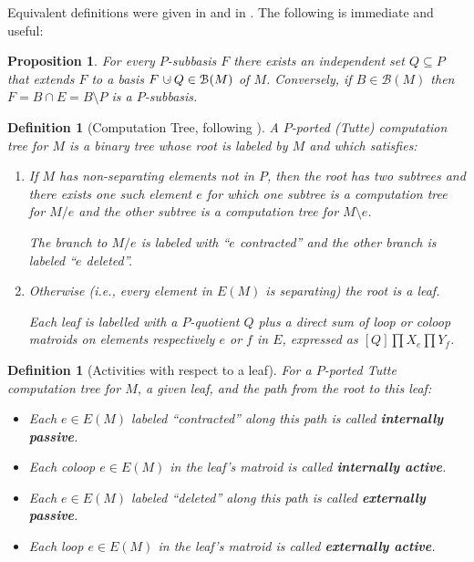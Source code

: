 \documentclass[12pt,leqno]{amsart}
\newtheorem{prop}[lem]{Proposition}
\newtheorem{definition}[lem]{Definition}
\theoremstyle{remark}
\newcommand{\dunion}
{\mbox{\hbox{\hskip6pt$\cdot$\hskip-5.50pt$\cup$\hskip2pt}}}
\begin{document}
Equivalent definitions were given in \cite{SetPointedLV}
and in \cite{RelTuttePoly}.   The following is immediate and
useful:

\begin{prop}
For every $P$-subbasis $F$ there exists an independent set $Q\subseteq P$
that extends $F$ to a basis $F\dunion Q\in \mathcal{B}(M)$ of $M$.
Conversely, if $B\in\mathcal{B}(M)$ then $F=B\cap E=B\setminus P$
is a $P$-subbasis.
\end{prop}

\begin{definition}[Computation Tree, following \cite{GordonMcMachonGreedoid}]
\label{CompTreeDef}
A $P$-ported (Tutte) computation tree for $M$ is a
binary tree whose root is labeled by $M$ and which satisfies:
\begin{enumerate}
\item If $M$ has non-separating elements not in $P$, then 
the root has two subtrees and there exists one such element $e$ for which 
one subtree is a computation tree
for $M/e$ and the other subtree is a computation tree for 
$M\setminus e$.

The branch to $M/e$ is labeled with ``$e$ contracted'' and 
the other branch is labeled ``$e$ deleted''.
\item Otherwise (i.e., every element in $E(M)$
is separating) the root is a leaf.  

Each leaf is labelled with a $P$-quotient $Q$ plus a direct sum
of loop or coloop matroids on elements respectively $e$ or $f$ in $E$, 
expressed
as $[Q]\prod X_e \prod Y_f$.
\end{enumerate}
\end{definition}


\begin{definition}[Activities with respect to a leaf]
\label{ActivityTreeDef}
For a $P$-ported Tutte computation tree for $M$,
a given leaf, and the path from the root to this leaf:
\begin{itemize}
\item Each $e\in E(M)$ labeled ``contracted'' along this path
is called \textbf{internally passive}.
\item Each coloop $e\in E(M)$ in the leaf's matroid is
called \textbf{internally active}.
\item Each $e\in E(M)$ labeled ``deleted'' along this path
is called \textbf{externally passive}.
\item Each loop $e\in E(M)$ in the leaf's matroid is
called \textbf{externally active}.
\end{itemize}
\end{definition}
\end{document}
